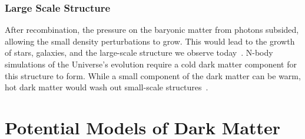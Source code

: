 \subsubsection*{Large Scale Structure}
After recombination, the pressure on the baryonic matter from photons subsided, allowing the small density perturbations to grow. This would lead to the growth of stars, galaxies, and the large-scale structure we observe today~\cite{Springel:2006vs_LargescalestructureUniverse}. N-body simulations of the Universe's evolution require a cold dark matter component for this structure to form. While a small component of the dark matter can be warm, hot dark matter would wash out small-scale structures~\cite{Springel:2005nw_Simulatingjointevolution}.  

\section{Potential Models of Dark Matter}

